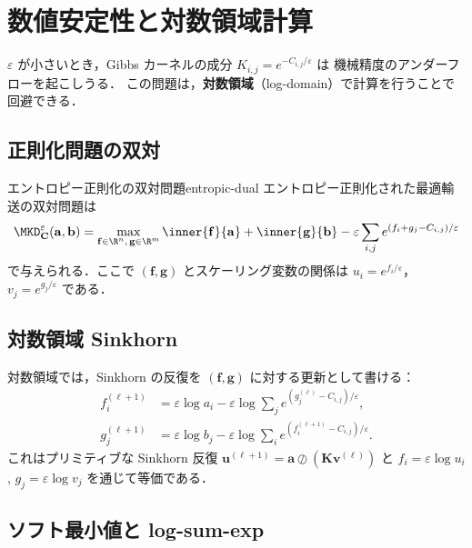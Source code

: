 \section{数値安定性と対数領域計算}
\label{sec:log-domain}

$\varepsilon$ が小さいとき，Gibbs カーネルの成分 $K_{i,j} = e^{-C_{i,j}/\varepsilon}$ は
機械精度のアンダーフローを起こしうる．
この問題は，\textbf{対数領域}（log-domain）で計算を行うことで回避できる．

\subsection{正則化問題の双対}

\begin{proposition}{エントロピー正則化の双対問題}{entropic-dual}
  エントロピー正則化された最適輸送の双対問題は
  \[
    \MKD_{\mathbf{C}}^\varepsilon(\mathbf{a}, \mathbf{b})
    = \max_{\mathbf{f} \in \R^n,\, \mathbf{g} \in \R^m}
    \inner{\mathbf{f}}{\mathbf{a}} + \inner{\mathbf{g}}{\mathbf{b}}
    - \varepsilon \sum_{i,j} e^{(f_i + g_j - C_{i,j})/\varepsilon}
  \]
  で与えられる．ここで $(\mathbf{f}, \mathbf{g})$ とスケーリング変数の関係は
  $u_i = e^{f_i/\varepsilon}$，$v_j = e^{g_j/\varepsilon}$ である．
\end{proposition}

\subsection{対数領域 Sinkhorn}

対数領域では，Sinkhorn の反復を $(\mathbf{f}, \mathbf{g})$ に対する更新として書ける：
\begin{align*}
  f_i^{(\ell+1)}
    &= \varepsilon \log a_i - \varepsilon \log \sum_j e^{(g_j^{(\ell)} - C_{i,j})/\varepsilon},
  \\
  g_j^{(\ell+1)}
    &= \varepsilon \log b_j - \varepsilon \log \sum_i e^{(f_i^{(\ell+1)} - C_{i,j})/\varepsilon}.
\end{align*}
これはプリミティブな Sinkhorn 反復
$\mathbf{u}^{(\ell+1)} = \mathbf{a} \oslash (\mathbf{K}\mathbf{v}^{(\ell)})$ と
$f_i = \varepsilon \log u_i$, $g_j = \varepsilon \log v_j$ を通じて等価である．

\subsection{ソフト最小値と log-sum-exp}

